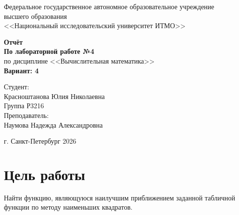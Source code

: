 \documentclass[12pt,a4paper]{article}
\begin{document}
\begin{titlepage}
    \begin{center}
        Федеральное государственное автономное образовательное учреждение\\
        высшего образования\\
        <<Национальный исследовательский университет ИТМО>>

        \vspace*{0.28\textheight}

        {\Large \textbf{Отчёт}}\\
        {\large \textbf{По лабораторной работе №4}}\\
        {\large по дисциплине <<Вычислительная математика>>}\\
        {\large \textbf{Вариант: 4}}
    \end{center}

    \vfill

    \begin{flushright}
        Студент:\\
        Красноштанова Юлия Николаевна\\
        Группа Р3216\\
        Преподаватель:\\
        Наумова Надежда Александровна
    \end{flushright}

    \vfill

    \begin{center}
        г. Санкт-Петербург 2026
    \end{center}
\end{titlepage}

\section*{Цель работы}
Найти функцию, являющуюся наилучшим приближением заданной табличной функции по методу наименьших квадратов.
\end{document}

